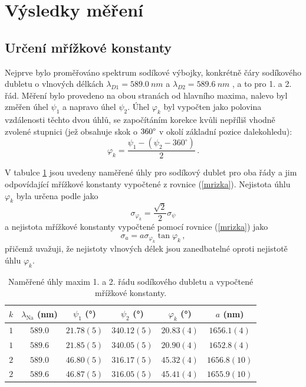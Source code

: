 \documentclass{../concepts/titul_protokol_p/prepareprotokol} %
\begin{document}
\section{Výsledky měření}

\subsection{Určení mřížkové konstanty}
Nejprve bylo proměřováno spektrum sodíkové výbojky, konkrétně čáry
sodíkového dubletu o vlnových délkách $\lambda_{D1} = \qty{589.0}{nm}$
a $\lambda_{D2} = \qty{589.6}{nm}$ \cite{pokyny}, a to pro 1.
a 2. řád. Měření bylo provedeno na obou stranách od hlavního maxima,
nalevo byl změřen úhel $\psi_1$ a napravo úhel $\psi_2$. Úhel
$\varphi_k$ byl vypočten jako polovina vzdálenosti těchto dvou úhlů,
se započítáním korekce kvůli nepříliš vhodně zvolené stupnici
(jež obsahuje skok o $360\degree$ v okolí základní pozice dalekohledu):
\begin{equation}\label{phik}
    \varphi_k = \frac{\psi_1 - \left(\psi_2 - 360^\circ\right)}{2} \, .
\end{equation}

V tabulce \ref{tab:sodik} jsou uvedeny naměřené úhly pro sodíkový 
dublet pro oba řády a jim odpovídající mřížkové konstanty vypočtené 
z rovnice (\ref{mrizka}). Nejistota úhlu $\varphi_k$ byla určena
podle \cite{englich} jako
\begin{equation}\label{sigmaphik}
    \sigma_{\varphi_k} = \frac{\sqrt{2}}{2}\sigma_{\psi} 
\end{equation}
a nejistota mřížkové konstanty vypočtené pomocí rovnice 
(\ref{mrizka}) jako
\begin{equation}\label{sigmaa}
    \sigma_a = a \sigma_{\varphi_k} \tan \varphi_k \, ,
\end{equation}
přičemž uvažuji, že nejistoty vlnových délek jsou zanedbatelné
oproti nejistotě úhlu $\varphi_k$.

\begin{table}[!htbp]
\centering
\caption{Naměřené úhly maxim 1. a 2. řádu sodíkového dubletu a
vypočtené mřížkové konstanty.}
\begin{tabular}{cccccc}
 \toprule
 $k$ & $\lambda_\mathrm{Na}$ (nm) & $\psi_1$ (°) & $\psi_2$ (°) & $\varphi_k$ (°) & $a$ (nm) \\
 \midrule
 $1$ & $589.0$ & $21.78(5)$ & $340.12(5)$ & $20.83(4)$ & $1656.1(4)$ \\
 $1$ & $589.6$ & $21.85(5)$ & $340.05(5)$ & $20.90(4)$ & $1652.8(4)$ \\
 $2$ & $589.0$ & $46.80(5)$ & $316.17(5)$ & $45.32(4)$ & $1656.8(10)$ \\
 $2$ & $589.6$ & $46.87(5)$ & $316.05(5)$ & $45.41(4)$ & $1655.9(10)$ \\
 \bottomrule
\end{tabular}
\label{tab:sodik}
\end{table}
\end{document}
